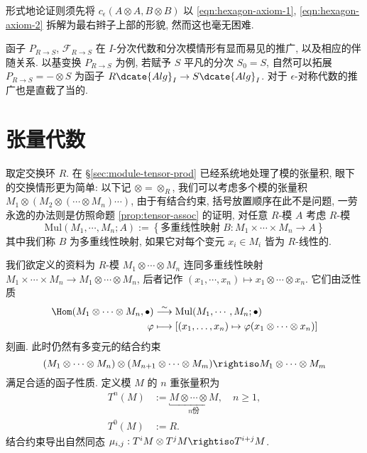 形式地论证则须先将 $c_\epsilon(A \otimes A, B \otimes B)$ 以 \eqref{eqn:hexagon-axiom-1}, \eqref{eqn:hexagon-axiom-2} 拆解为最右辫子上部的形貌, 然而这也毫无困难.

\begin{remark}
	函子 $P_{R \to S}$, $\mathcal{F}_{R \to S}$ 在 $I$-分次代数和分次模情形有显而易见的推广, 以及相应的伴随关系. 以基变换 $P_{R \to S}$ 为例, 若赋予 $S$ 平凡的分次 $S_0 = S$, 自然可以拓展 $P_{R \to S} = - \otimes S$ 为函子 $R\dcate{Alg}_I \to S\dcate{Alg}_I$. 对于 $\epsilon$-对称代数的推广也是直截了当的.
\end{remark}

\section{张量代数}
取定交换环 $R$. 在 \S\ref{sec:module-tensor-prod} 已经系统地处理了模的张量积, 眼下的交换情形更为简单: 以下记 $\otimes = \otimes_R$, 我们可以考虑多个模的张量积 $M_1 \otimes (M_2 \otimes (\cdots \otimes M_n )\cdots)$, 由于有结合约束, 括号放置顺序在此不是问题, 一劳永逸的办法则是仿照命题 \ref{prop:tensor-assoc} 的证明, 对任意 $R$-模 $A$ 考虑 $R$-模
\[ \text{Mul}(M_1, \cdots, M_n; A) := \left\{ \text{多重线性映射}\; B: M_1 \times \cdots \times M_n \to A \right\} \]
其中我们称 $B$ 为多重线性映射, 如果它对每个变元 $x_i \in M_i$ 皆为 $R$-线性的.

我们欲定义的资料为 $R$-模 $M_1 \otimes \cdots \otimes M_n$ 连同多重线性映射 $M_1 \times \cdots \times M_n \to M_1 \otimes \cdots \otimes M_n$, 后者记作 $(x_1, \cdots, x_n) \mapsto x_1 \otimes \cdots \otimes x_n$. 它们由泛性质
\begin{equation}\label{eqn:Mul-tensor}\begin{aligned}
	\Hom(M_1 \otimes \cdots \otimes M_n, \bullet) & \stackrel{\sim}{\longrightarrow} \text{Mul}(M_1, \cdots, M_n; \bullet) \\
	\varphi & \longmapsto [ (x_1, \ldots, x_n) \mapsto \varphi(x_1 \otimes \cdots \otimes x_n) ]
\end{aligned}\end{equation}
刻画. 此时仍然有多变元的结合约束
\[ (M_1 \otimes \cdots \otimes M_n) \otimes (M_{n+1} \otimes \cdots \otimes M_m) \rightiso M_1 \otimes \cdots \otimes M_m \]
满足合适的函子性质. 定义模 $M$ 的 $n$ 重张量积为
\begin{align*}
	T^n(M) & := \underbracket{M \otimes \cdots \otimes M}_{n \text{份}}, \quad n \geq 1, \\
	T^0(M) & := R.
\end{align*}
结合约束导出自然同态 $\mu_{i,j}: T^i M \otimes T^j M \rightiso T^{i+j} M$.

